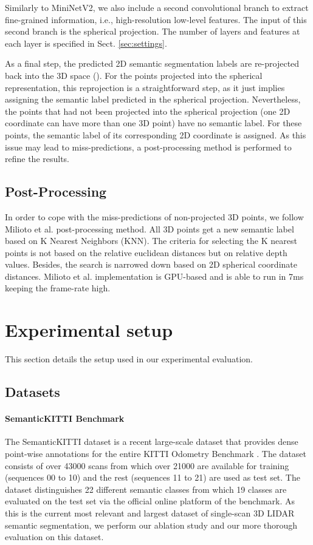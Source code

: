 \documentclass[letterpaper, 10 pt, journal, twoside]{IEEEtran}
\begin{document}
Similarly to MiniNetV2, we also include a second convolutional branch to extract fine-grained information, i.e., high-resolution low-level features. The input of this second branch is the spherical projection. 
The number of layers and features at each layer is specified in Sect. \ref{sec:settings}.


As a final step, the predicted 2D semantic segmentation labels are re-projected back into the 3D space (). For the points projected into the spherical representation, this reprojection is a straightforward step,
as it just implies assigning the semantic label predicted in the spherical projection. Nevertheless, the points that had not been projected into the spherical projection (one 2D coordinate can have more than one 3D point) have no semantic label. For these points,  the semantic label  of its corresponding 2D coordinate is assigned. As this issue may lead to miss-predictions, a post-processing method is performed to refine the results.

\subsection{Post-Processing}
In order to cope with the miss-predictions of non-projected 3D points, we follow Milioto et al. \cite{milioto2019rangenet++} post-processing method. 
All 3D points get a new semantic label  based on K Nearest Neighbors (KNN). 
The criteria for selecting the K nearest points is not based on the relative euclidean distances but on relative depth values. Besides, the search is narrowed down based on 2D spherical coordinate distances. Milioto et al. implementation is GPU-based and is able to run in 7ms keeping the frame-rate high. 
  
  
\section{Experimental setup}
\label{sec:experimental_setup}

This section details the setup used in our experimental evaluation.

\subsection{Datasets}

\paragraph*{SemanticKITTI Benchmark}
The SemanticKITTI dataset \cite{behley2019semantickitti} is a recent large-scale dataset that provides dense point-wise annotations for the entire KITTI Odometry Benchmark \cite{geiger2012wekitti}.
The dataset consists of over 43000 scans from which over 21000 are available for training (sequences 00 to 10) and the rest (sequences 11 to 21) are used as test set.
The dataset distinguishes 22 different semantic classes from which 19 classes  are evaluated on the test set via  the official online platform of the benchmark. 
As this is the current most relevant and largest dataset of single-scan 3D LIDAR semantic segmentation, we perform our ablation study and our more thorough evaluation on this dataset.
 
\end{document}
